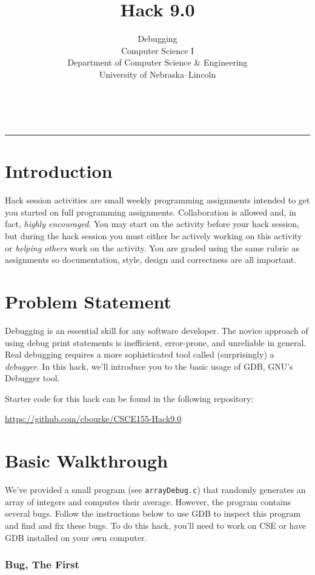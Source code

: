 \documentclass[12pt]{scrartcl}
\title{Hack 9.0}\let\Title\@title
\subtitle{Debugging \\
Computer Science I\\
{\small
\vskip1cm
Department of Computer Science \& Engineering \\
University of Nebraska--Lincoln}
\vskip-1cm}
\date{~}
\begin{document}
\maketitle

\hrule

\section*{Introduction}

Hack session activities are small weekly programming assignments intended
to get you started on full programming assignments.  Collaboration is allowed
and, in fact, \emph{highly encouraged}.  You may start on the activity before
your hack session, but during the hack session you must either be actively 
working on this activity or \emph{helping others} work on the activity.
You are graded using the same rubric as assignments so documentation, style, 
design and correctness are all important.  

\section*{Problem Statement}

Debugging is an essential skill for any software developer.  The novice
approach of using debug print statements is inefficient, error-prone, and
unreliable in general.  Real debugging requires a more sophisticated tool
called (surprisingly) a \emph{debugger}.  In this hack, we'll introduce you
to the basic usage of GDB, GNU's Debugger tool.

Starter code for this hack can be found in the following repository:

\url{https://github.com/cbourke/CSCE155-Hack9.0}

\section*{Basic Walkthrough}

We've provided a small program (see \texttt{arrayDebug.c}) 
that randomly generates an array of integers
and computes their average.  However, the program contains several bugs.
Follow the instructions below to use GDB to inspect this program and find
and fix these bugs.  To do this hack, you'll need to work on CSE or have 
GDB installed on your own computer.

\subsubsection*{Bug, The First}
\end{document}

